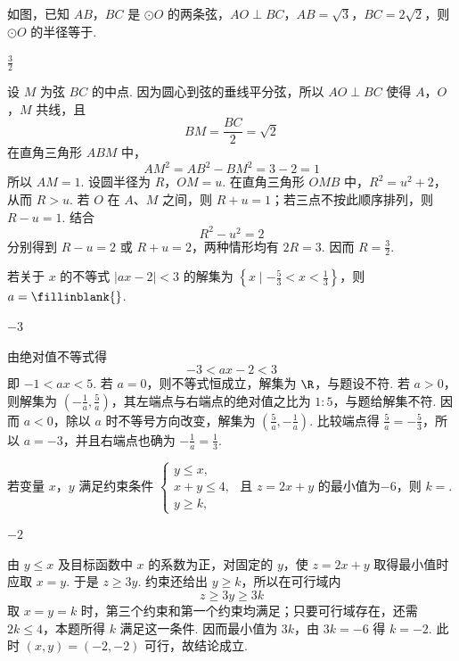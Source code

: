 \begin{problem}
如图，已知 \(AB\)，\(BC\) 是 \(\odot O\) 的两条弦，\(AO \perp BC\)，\(AB = \sqrt{3}\)，\(BC = 2\sqrt{2}\)，则 \(\odot O\) 的半径等于\fillinblank{}.

\begin{answer}
\(\frac{3}{2}\)
\end{answer}

\begin{solution}
设 \(M\) 为弦 \(BC\) 的中点. 因为圆心到弦的垂线平分弦，所以 \(AO\perp BC\) 使得 \(A\)，\(O\)，\(M\) 共线，且
\[
BM=\frac{BC}{2}=\sqrt{2}
\]
在直角三角形 \(ABM\) 中，
\[
AM^2=AB^2-BM^2=3-2=1
\]
所以 \(AM=1\). 设圆半径为 \(R\)，\(OM=u\). 在直角三角形 \(OMB\) 中，\(R^2=u^2+2\)，从而 \(R>u\). 若 \(O\) 在 \(A\)、\(M\) 之间，则 \(R+u=1\)；若三点不按此顺序排列，则 \(R-u=1\). 结合
\[
R^2-u^2=2
\]
分别得到 \(R-u=2\) 或 \(R+u=2\)，两种情形均有 \(2R=3\). 因而 \(R=\frac{3}{2}\).
\end{solution}
\end{problem}

\begin{problem}
若关于 \(x\) 的不等式 \(\left|ax - 2\right| < 3\) 的解集为 \(\left\{x\mid -\frac{5}{3} < x < \frac{1}{3}\right\}\)，则 \(a =\fillinblank{}\).
\begin{answer}
\(-3\)
\end{answer}

\begin{solution}
由绝对值不等式得
\[
-3<ax-2<3
\]
即 \(-1<ax<5\). 若 \(a=0\)，则不等式恒成立，解集为 \(\R\)，与题设不符. 若 \(a>0\)，则解集为 \(\left(-\frac{1}{a},\frac{5}{a}\right)\)，其左端点与右端点的绝对值之比为 \(1:5\)，与题给解集不符. 因而 \(a<0\)，除以 \(a\) 时不等号方向改变，解集为 \(\left(\frac{5}{a},-\frac{1}{a}\right)\). 比较端点得 \(\frac{5}{a}=-\frac{5}{3}\)，所以 \(a=-3\)，并且右端点也确为 \(-\frac{1}{a}=\frac{1}{3}\).
\end{solution}
\end{problem}

\begin{problem}
若变量 \(x\)，\(y\) 满足约束条件 \(\begin{cases}
y \leqslant x,\\
x + y \leqslant 4,\\
y \geqslant k,
\end{cases}\) 且 \(z = 2x + y\) 的最小值为\(-6\)，则 \(k = \)\fillinblank{}.
\begin{answer}
\(-2\)
\end{answer}

\begin{solution}
由 \(y\leqslant x\) 及目标函数中 \(x\) 的系数为正，对固定的 \(y\)，使 \(z=2x+y\) 取得最小值时应取 \(x=y\). 于是 \(z\geqslant3y\). 约束还给出 \(y\geqslant k\)，所以在可行域内
\[
z\geqslant3y\geqslant3k
\]
取 \(x=y=k\) 时，第三个约束和第一个约束均满足；只要可行域存在，还需 \(2k\leqslant4\)，本题所得 \(k\) 满足这一条件. 因而最小值为 \(3k\)，由 \(3k=-6\) 得 \(k=-2\). 此时 \((x,y)=(-2,-2)\) 可行，故结论成立.
\end{solution}
\end{problem}

